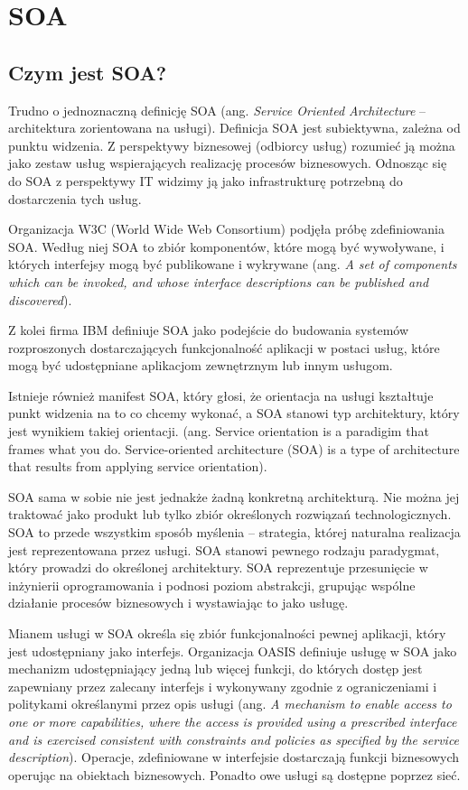 \section{SOA}
\subsection{Czym jest SOA?}
Trudno o jednoznaczną definicję SOA (ang. \emph{Service Oriented Architecture} – architektura zorientowana na usługi). Definicja SOA jest subiektywna, zależna od punktu widzenia. Z perspektywy biznesowej (odbiorcy usług) rozumieć ją można jako zestaw usług wspierających realizację procesów biznesowych. Odnosząc się do SOA z perspektywy IT widzimy ją jako infrastrukturę potrzebną do dostarczenia tych usług.
	
Organizacja W3C (World Wide Web Consortium) podjęła próbę zdefiniowania SOA. Według niej SOA to zbiór komponentów, które mogą być wywoływane, i których interfejsy mogą być publikowane i wykrywane (ang. \emph{A set of components which can be invoked, and whose interface descriptions can be published and discovered}).

Z kolei firma IBM definiuje SOA jako podejście do budowania systemów rozproszonych dostarczających funkcjonalność aplikacji w postaci usług, które mogą być udostępniane aplikacjom zewnętrznym lub innym usługom. \cite{PlatIntGor}

Istnieje również manifest SOA, który głosi, że orientacja na usługi kształtuje punkt widzenia na to co chcemy wykonać, a SOA stanowi typ architektury, który jest wynikiem takiej orientacji. (ang. Service orientation is a paradigim that frames what you do. Service-oriented architecture (SOA) is a type of architecture that results from applying service orientation). \cite{SOAManifestoOrg}

SOA sama w sobie nie jest jednakże żadną konkretną architekturą. Nie można jej traktować jako produkt lub tylko zbiór określonych rozwiązań technologicznych. SOA to przede wszystkim sposób myślenia – strategia, której naturalna realizacja jest reprezentowana przez usługi. \cite{SOAsdj102009,SOAwJBBC} SOA stanowi pewnego rodzaju paradygmat, który prowadzi do określonej architektury. \cite{SOAsdj102009} SOA reprezentuje przesunięcie w inżynierii oprogramowania i podnosi poziom abstrakcji, grupując wspólne działanie procesów biznesowych i wystawiając to jako usługę. \cite{CompSOAMet}
	
Mianem usługi w SOA określa się zbiór funkcjonalności pewnej aplikacji, który jest udostępniany jako interfejs. \cite{SOAawidptas} Organizacja OASIS definiuje usługę w SOA jako mechanizm udostępniający jedną lub więcej funkcji, do których dostęp jest zapewniany przez zalecany interfejs i wykonywany zgodnie z ograniczeniami i politykami określanymi przez opis usługi (ang. \emph{A mechanism to enable access to one or more capabilities, where the access is provided using a prescribed interface and is exercised consistent with constraints and policies as specified by the service description}). Operacje, zdefiniowane w interfejsie dostarczają funkcji biznesowych operując na obiektach biznesowych. Ponadto owe usługi są dostępne poprzez sieć.

